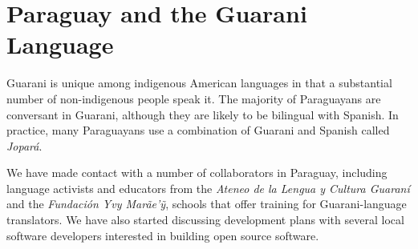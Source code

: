 \section{Paraguay and the Guarani Language}
Guarani is unique among indigenous American languages in that a substantial
number of non-indigenous people speak it.  The majority of Paraguayans are
conversant in Guarani, although they are likely to be bilingual with Spanish.
In practice, many Paraguayans use a combination of Guarani and Spanish called
\emph{Jopar{\'a}}.

We have made contact with a number of collaborators in Paraguay, including
language activists and educators from the \emph{Ateneo de la Lengua y Cultura
Guaraní} and the \emph{Fundación Yvy Marãe'{\~y}}, schools that offer training
for Guarani-language translators. We have also started discussing development
plans with several local software developers interested in building open source
software.
